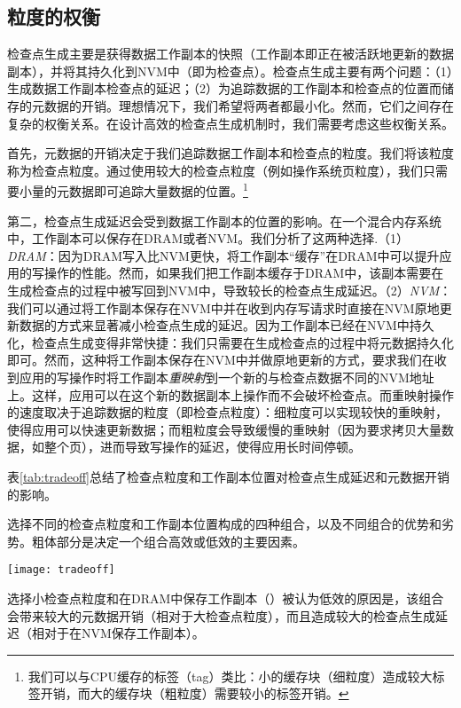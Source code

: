 \subsection{粒度的权衡}

检查点生成主要是获得数据工作副本的快照（工作副本即正在被活跃地更新的数据副本），并将其持久化到NVM中（即为检查点）。检查点生成主要有两个问题：（1）生成数据工作副本检查点的延迟；（2）为追踪数据的工作副本和检查点的位置而储存的元数据的开销。理想情况下，我们希望将两者都最小化。然而，它们之间存在复杂的权衡关系。在设计高效的检查点生成机制时，我们需要考虑这些权衡关系。

首先，元数据的开销决定于我们追踪数据工作副本和检查点的粒度。我们将该粒度称为检查点粒度。通过使用较大的检查点粒度（例如操作系统页粒度），我们只需要小量的元数据即可追踪大量数据的位置。\footnote{我们可以与CPU缓存的标签（tag）类比：小的缓存块（细粒度）造成较大标签开销，而大的缓存块（粗粒度）需要较小的标签开销。}

第二，检查点生成延迟会受到数据工作副本的位置的影响。在一个混合内存系统中，工作副本可以保存在DRAM或者NVM。我们分析了这两种选择.（1）{\em DRAM}：因为DRAM写入比NVM更快，将工作副本“缓存”在DRAM中可以提升应用的写操作的性能。然而，如果我们把工作副本缓存于DRAM中，该副本需要在生成检查点的过程中被写回到NVM中，导致较长的检查点生成延迟。（2）{\em NVM}：我们可以通过将工作副本保存在NVM中并在收到内存写请求时直接在NVM原地更新数据的方式来显著减小检查点生成的延迟。因为工作副本已经在NVM中持久化，检查点生成变得非常快捷：我们只需要在生成检查点的过程中将元数据持久化即可。然而，这种将工作副本保存在NVM中并做原地更新的方式，要求我们在收到应用的写操作时将工作副本\emph{重映射}到一个新的与检查点数据不同的NVM地址上。这样，应用可以在这个新的数据副本上操作而不会破坏检查点。而重映射操作的速度取决于追踪数据的粒度（即检查点粒度）：细粒度可以实现较快的重映射，使得应用可以快速更新数据；而粗粒度会导致缓慢的重映射（因为要求拷贝大量数据，如整个页），进而导致写操作的延迟，使得应用长时间停顿。

表\ref{tab:tradeoff}总结了检查点粒度和工作副本位置对检查点生成延迟和元数据开销的影响。

\begin{table}[!h]
  \centering
  \caption{选择不同的检查点粒度和工作副本位置构成的四种组合，以及不同组合的优势和劣势。粗体部分是决定一个组合高效或低效的主要因素。}
  \texttt{[image: tradeoff]}
  \label{tab:tradeoff}
\end{table}

选择小检查点粒度和在DRAM中保存工作副本（）被认为低效的原因是，该组合会带来较大的元数据开销（相对于大检查点粒度），而且造成较大的检查点生成延迟（相对于在NVM保存工作副本）。

